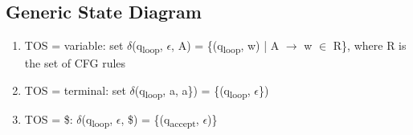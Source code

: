 \documentclass[11pt]{article}
\begin{document}
\subsection{Generic State Diagram}
\label{sec:org84812f3}
\begin{enumerate}
\item TOS = variable: set \(\delta\)(q\textsubscript{loop}, \(\epsilon\), A) = \{(q\textsubscript{loop}, w) | A \(\rightarrow\) w \(\in\) R\}, where R is the set of CFG rules\\
\item TOS = terminal: set \(\delta\)(q\textsubscript{loop}, a, a\}) = \{(q\textsubscript{loop}, \(\epsilon\)\})\\
\item TOS = \$: \(\delta\)(q\textsubscript{loop}, \(\epsilon\), \$) = \{(q\textsubscript{accept}, \(\epsilon\))\}\\
\end{enumerate}
\end{document}
